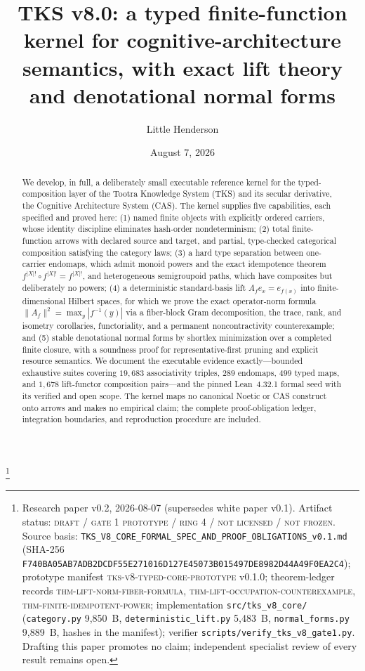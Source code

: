 \documentclass[11pt]{amsart}
\theoremstyle{definition}
\theoremstyle{remark}
\begin{document}
\title[TKS v8.0: a typed finite-function kernel]{TKS v8.0: a typed finite-function kernel for cognitive-architecture semantics, with exact lift theory and denotational normal forms}
\author{Little Henderson}
\thanks{Research paper v0.2, 2026-08-07 (supersedes white paper v0.1). Artifact status: \textsc{draft / gate 1 prototype / ring 4 / not licensed / not frozen}. Source basis: \texttt{TKS\_V8\_CORE\_FORMAL\_SPEC\_AND\_PROOF\_OBLIGATIONS\_v0.1.md} (SHA-256 \texttt{F740BA05AB7ADB2DCDF55E271016D127E45073B015497DE8982D44A49F0EA2C4}); prototype manifest \textsc{tks-v8-typed-core-prototype} v0.1.0; theorem-ledger records \textsc{thm-lift-norm-fiber-formula}, \textsc{thm-lift-occupation-counterexample}, \textsc{thm-finite-idempotent-power}; implementation \texttt{src/tks\_v8\_core/} (\texttt{category.py} 9{,}850~B, \texttt{deterministic\_lift.py} 5{,}483~B, \texttt{normal\_forms.py} 9{,}889~B, hashes in the manifest); verifier \texttt{scripts/verify\_tks\_v8\_gate1.py}. Drafting this paper promotes no claim; independent specialist review of every result remains open.}
\date{August 7, 2026}

\begin{abstract}
We develop, in full, a deliberately small executable reference kernel for the typed-composition layer of the Tootra Knowledge System (TKS) and its secular derivative, the Cognitive Architecture System (CAS). The kernel supplies five capabilities, each specified and proved here: (1) named finite objects with explicitly ordered carriers, whose identity discipline eliminates hash-order nondeterminism; (2) total finite-function arrows with declared source and target, and partial, type-checked categorical composition satisfying the category laws; (3) a hard type separation between one-carrier endomaps, which admit monoid powers and the exact idempotence theorem $f^{|X|!}\circ f^{|X|!}=f^{|X|!}$, and heterogeneous semigroupoid paths, which have composites but deliberately no powers; (4) a deterministic standard-basis lift $A_f e_x=e_{f(x)}$ into finite-dimensional Hilbert spaces, for which we prove the exact operator-norm formula $\lVert A_f\rVert^2=\max_y|f^{-1}(y)|$ via a fiber-block Gram decomposition, the trace, rank, and isometry corollaries, functoriality, and a permanent noncontractivity counterexample; and (5) stable denotational normal forms by shortlex minimization over a completed finite closure, with a soundness proof for representative-first pruning and explicit resource semantics. We document the executable evidence exactly---bounded exhaustive suites covering $19{,}683$ associativity triples, $289$ endomaps, $499$ typed maps, and $1{,}678$ lift-functor composition pairs---and the pinned Lean~4.32.1 formal seed with its verified and open scope. The kernel maps no canonical Noetic or CAS construct onto arrows and makes no empirical claim; the complete proof-obligation ledger, integration boundaries, and reproduction procedure are included.
\end{abstract}
\end{document}
